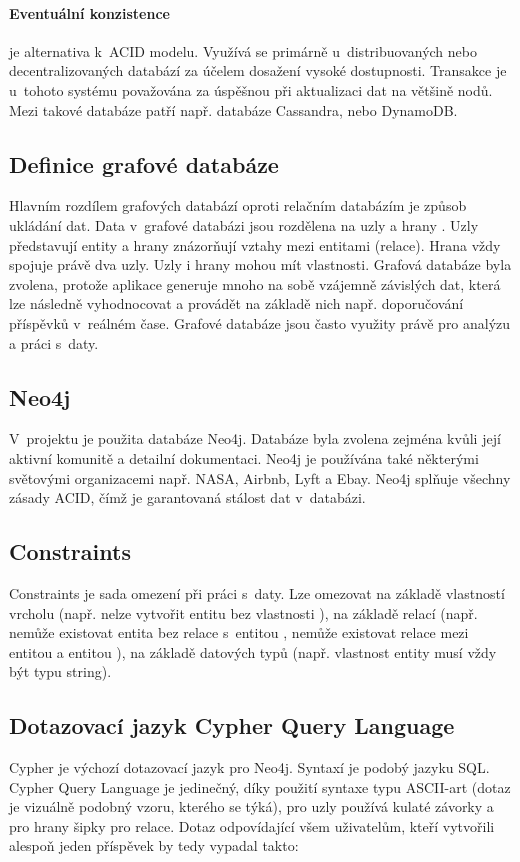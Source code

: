 \documentclass[12pt, a4paper,
  oneside,      %
]{report}
\begin{document}
\paragraph{Eventuální konzistence} je alternativa k~ACID modelu. Využívá se primárně u~distribuovaných nebo decentralizovaných databází za účelem dosažení vysoké dostupnosti. Transakce je u~tohoto systému považována za úspěšnou při aktualizaci dat na většině nodů. Mezi takové databáze patří např. databáze Cassandra, nebo DynamoDB.

\subsection{Definice grafové databáze}
Hlavním rozdílem grafových databází oproti relačním databázím je způsob ukládání dat.
Data v~grafové databázi jsou rozdělena na uzly a hrany \cite{graphenTheorie}. Uzly představují entity a hrany znázorňují vztahy mezi entitami (relace). Hrana vždy spojuje právě dva uzly.
Uzly i hrany mohou mít vlastnosti. Grafová databáze byla zvolena, protože aplikace generuje mnoho na sobě vzájemně závislých dat, která
lze následně vyhodnocovat a provádět na základě nich např. doporučování příspěvků v~reálném čase. Grafové databáze jsou často využity právě pro analýzu a práci s~daty. \cite{graphDatabasesIntroduction}\cite{graphAlgorithms}
\subsection{Neo4j}
V~projektu je použita databáze Neo4j. Databáze byla zvolena zejména kvůli její aktivní komunitě a detailní dokumentaci. Neo4j je používána také některými světovými organizacemi např. NASA, Airbnb, Lyft a Ebay. Neo4j splňuje všechny zásady ACID, čímž je garantovaná stálost dat v~databázi. \cite{aboutNeo4j}
\subsection{Constraints}
Constraints je sada omezení při práci s~daty. Lze omezovat na základě vlastností vrcholu (např. nelze vytvořit entitu  bez vlastnosti ), na základě relací (např. nemůže existovat entita  bez relace  s~entitou , nemůže existovat relace  mezi entitou  a entitou ), na základě datových typů (např. vlastnost  entity  musí vždy být typu string).

\subsection{Dotazovací jazyk Cypher Query Language}
Cypher je výchozí dotazovací jazyk pro Neo4j. Syntaxí je podobý jazyku SQL. Cypher Query Language je jedinečný, díky použití syntaxe typu ASCII-art (dotaz je vizuálně podobný vzoru, kterého se týká), pro uzly používá kulaté závorky a pro hrany šipky pro relace. Dotaz odpovídající všem uživatelům, kteří vytvořili alespoň jeden příspěvek by tedy vypadal takto:  \cite{CypherQL}
\end{document}
